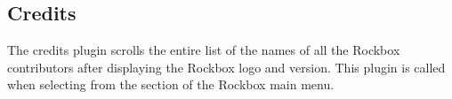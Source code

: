 \subsection{Credits}
The credits plugin scrolls the entire list of the names of all the Rockbox
contributors after displaying the Rockbox logo and version. This plugin is
called when selecting  from the  section of
the Rockbox main menu.
